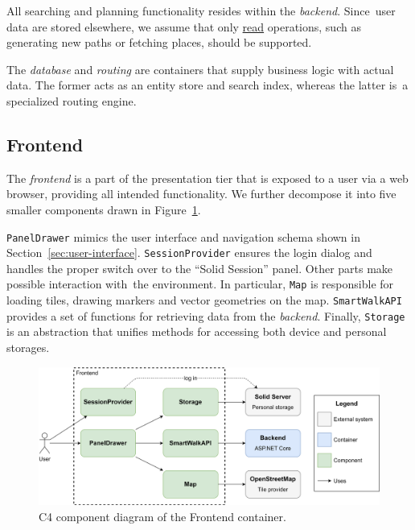 All searching and planning functionality resides within the \emph{backend}. Since~user data are stored elsewhere, we assume that only \underline{read} operations, such as generating new paths or fetching places, should be supported.

The \emph{database} and \emph{routing} are containers that supply business logic with actual data. The former acts as an entity store and search index, whereas the latter is~a specialized routing engine.

\subsection{Frontend}\label{ssec:design-frontend}


The \emph{frontend} is a part of the presentation tier that is exposed to a user via a web browser, providing all intended functionality. We further decompose it into five smaller components drawn in Figure~\ref{fig:c4-component-diagram-frontend}.

\texttt{PanelDrawer} mimics the user interface and navigation schema shown in Section~\ref{sec:user-interface}. \texttt{SessionProvider} ensures the login dialog and handles the proper switch over to the ``Solid Session'' panel. Other parts make possible interaction with~the environment. In particular, \texttt{Map} is responsible for loading tiles, drawing markers and vector geometries on the map. \texttt{SmartWalkAPI} provides a set of functions for retrieving data from the \emph{backend}. Finally, \texttt{Storage} is an abstraction that unifies methods for accessing both device and personal storages.

\begin{figure}[h!]
\centering
\includegraphics[width=\linewidth]{img/design/c4-component-diagram-frontend.png}
\caption{C4 component diagram of the Frontend container.}
\label{fig:c4-component-diagram-frontend}
\end{figure}

